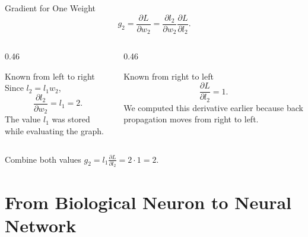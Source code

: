 \documentclass[aspectratio=169]{beamer}
\begin{document}
\begin{frame}{Gradient for One Weight}
  \small
  \begin{equation*}
    g_2
    = \frac{\partial L}{\partial w_2}
    = \frac{\partial l_2}{\partial w_2}
      \frac{\partial L}{\partial l_2}.
  \end{equation*}

  \begin{columns}[T]
    \begin{column}{0.46\textwidth}
      \begin{block}{Known from left to right}
        Since $l_2=l_1w_2$,
        \begin{equation*}
          \frac{\partial l_2}{\partial w_2}=l_1=2.
        \end{equation*}
        The value $l_1$ was stored while evaluating the graph.
      \end{block}
    \end{column}
    \begin{column}{0.46\textwidth}
      \begin{block}{Known from right to left}
        \begin{equation*}
          \frac{\partial L}{\partial l_2}=1.
        \end{equation*}
        We computed this derivative earlier because back propagation moves
        from right to left.
      \end{block}
    \end{column}
  \end{columns}

  \begin{alertblock}{Combine both values}
    \centering
    $g_2=l_1\frac{\partial L}{\partial l_2}=2\cdot1=2.$
  \end{alertblock}
\end{frame}

\section{From Biological Neuron to Neural Network}
\end{document}
